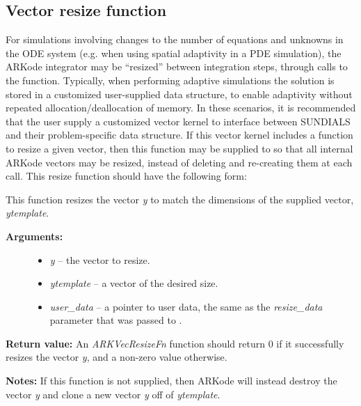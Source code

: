 \documentclass[letterpaper,10pt,english]{sphinxmanual}
\begin{document}
\subsection{Vector resize function}
\label{c_interface/User_supplied:cinterface-vecresizefn}\label{c_interface/User_supplied:vector-resize-function}
For simulations involving changes to the number of equations and
unknowns in the ODE system (e.g. when using spatial adaptivity in a
PDE simulation), the ARKode integrator may be ``resized'' between
integration steps, through calls to the {\hyperref[c_interface/User_callable:c.ARKodeResize]{\emph{}}}
function. Typically, when performing adaptive simulations the solution
is stored in a customized user-supplied data structure, to enable
adaptivity without repeated allocation/deallocation of memory.  In
these scenarios, it is recommended that the user supply a customized
vector kernel to interface between SUNDIALS and their problem-specific
data structure.  If this vector kernel includes a function to resize a
given vector, then this function may be supplied to
{\hyperref[c_interface/User_callable:c.ARKodeResize]{\emph{}}} so that all internal ARKode vectors may be
resized, instead of deleting and re-creating them at each call.  This
resize function should have the following form:

\begin{fulllineitems}
\label{c_interface/User_supplied:c.ARKVecResizeFn}
This function resizes the vector \emph{y} to match the dimensions of the
supplied vector, \emph{ytemplate}.
\begin{description}
\item[{\textbf{Arguments:}}] \leavevmode\begin{itemize}
\item {} 
\emph{y} -- the vector to resize.

\item {} 
\emph{ytemplate} -- a vector of the desired size.

\item {} 
\emph{user\_data} -- a pointer to user data, the same as the
\emph{resize\_data} parameter that was passed to {\hyperref[c_interface/User_callable:c.ARKodeResize]{\emph{}}}.

\end{itemize}

\end{description}

\textbf{Return value:}
An \emph{ARKVecResizeFn} function should return 0 if it successfully
resizes the vector \emph{y}, and a non-zero value otherwise.

\textbf{Notes:}  If this function is not supplied, then ARKode will
instead destroy the vector \emph{y} and clone a new vector \emph{y} off of
\emph{ytemplate}.

\end{fulllineitems}
\end{document}
